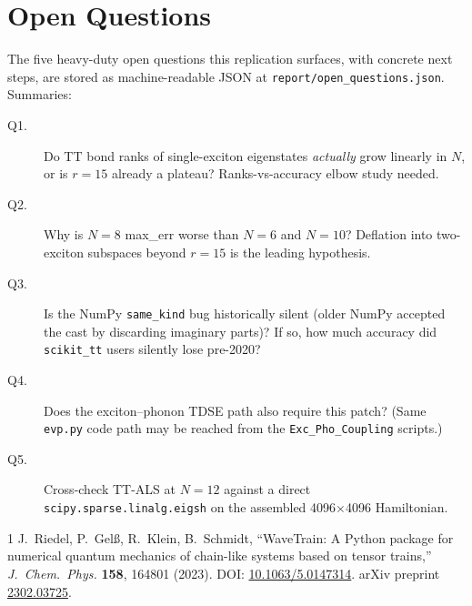 \documentclass[11pt]{article}
\begin{document}
\section{Open Questions}
The five heavy-duty open questions this replication surfaces, with concrete
next steps, are stored as machine-readable JSON at
\texttt{report/open\_questions.json}.  Summaries:
\begin{description}
\item[Q1.] Do TT bond ranks of single-exciton eigenstates \emph{actually} grow
      linearly in $N$, or is $r{=}15$ already a plateau?  Ranks-vs-accuracy
      elbow study needed.
\item[Q2.] Why is $N{=}8$ max\_err worse than $N{=}6$ and $N{=}10$?
      Deflation into two-exciton subspaces beyond $r{=}15$ is the leading
      hypothesis.
\item[Q3.] Is the NumPy \texttt{same\_kind} bug historically silent (older
      NumPy accepted the cast by discarding imaginary parts)?  If so, how much
      accuracy did \texttt{scikit\_tt} users silently lose pre-2020?
\item[Q4.] Does the exciton--phonon TDSE path also require this patch?
      (Same \texttt{evp.py} code path may be reached from the
      \texttt{Exc\_Pho\_Coupling} scripts.)
\item[Q5.] Cross-check TT-ALS at $N{=}12$ against a direct
      \texttt{scipy.sparse.linalg.eigsh} on the assembled 4096$\times$4096
      Hamiltonian.
\end{description}

\begin{thebibliography}{1}
J.~Riedel, P.~Gel\ss{}, R.~Klein, B.~Schmidt,
\newblock ``WaveTrain: A Python package for numerical quantum mechanics of
chain-like systems based on tensor trains,''
\newblock \emph{J.\ Chem.\ Phys.} \textbf{158}, 164801 (2023).
\newblock DOI: \href{https://doi.org/10.1063/5.0147314}{10.1063/5.0147314}.
\newblock arXiv preprint \href{https://arxiv.org/abs/2302.03725}{2302.03725}.
\end{thebibliography}
\end{document}
